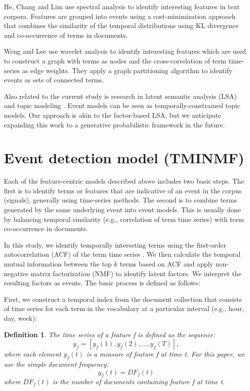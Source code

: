 \documentclass{sig-alternate}
\newtheorem{definition}{Definition}
\begin{document}
He, Chang and Lim \cite{He2007} use spectral analysis to identify interesting features in text corpora. Features are grouped into events using a cost-minimization approach that combines the similarity of the temporal distributions using KL divergence and co-occurrence of terms in documents. 

Weng and Lee \cite{Weng2011} use wavelet analysis to identify interesting features which are used to construct a graph with terms as nodes and the cross-correlation of term time-series as edge weights. They apply a graph partitioning algorithm to identify events as sets of connected terms. 

Also related to the current study is research in latent semantic analysis (LSA) \cite{Deerwester1990, Hofmann1999} and topic modeling \cite{Blei2003}.  Event models can be seen as temporally-constrained topic models. Our approach is akin to the factor-based LSA, but we anticipate expanding this work to a generative probabilistic framework in the future.  




\section{Event detection model (TMINMF)}	

Each of the feature-centric models described above includes two basic steps. The first is to identify terms or features that are indicative of an event in the corpus (signals), generally using time-series methods. The second is to combine terms generated by the same underlying event into event models.  This is usually done by balancing temporal similarity (e.g., correlation of term time series) with term co-occurrence in documents.

In this study, we identify temporally interesting terms using the first-order autocorrelation (ACF) of the term time series \cite{Jones2007}. We then calculate the temporal mutual information between the top $k$ terms based on ACF and apply non-negative matrix factorization (NMF) to identify latent factors. We interpret the resulting factors as events. The basic process is defined as follows:

First, we construct a temporal index from the document collection that consists of time series for each term in the vocabulary at a particular interval (e.g., hour, day, week):
\begin{definition}
 The time series of a feature f is defined as the sequence:
\[
y_f = [y_f(1), y_f(2), ..., y_f(T)],
\]
where each element $y_f(t)$ is a measure of feature f at time t. For this paper, we use the simple document frequency:
\[
	y_f(t) = DF_f(t)
\]
where $DF_f(t)$ is the number of documents containing feature f at time t.
\end{definition}
\end{document}
